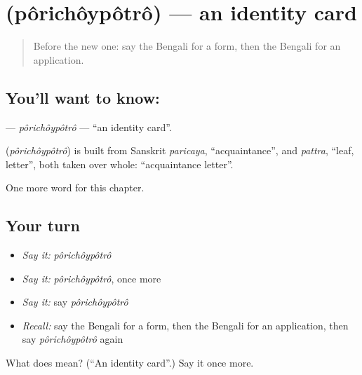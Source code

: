 \section[\texorpdfstring{\bn{পরিচয়পত্র} (pôrichôypôtrô)}{পরিচয়পত্র (pôrichôypôtrô)}]{ (pôrichôypôtrô) — an identity card}

\label{lesson:BN-C259-porichoypotro}



\begin{quote}
Before the new one: say the Bengali for a form, then the Bengali for an application.
\end{quote}

\subsection*{You'll want to know: }
\textbf{} — \emph{pôrichôypôtrô} — \textquotedblleft{}an identity card\textquotedblright{}.

\begin{cousinweb}
\textbf{} (\emph{pôrichôypôtrô}) is built from Sanskrit \emph{paricaya}, \textquotedblleft{}acquaintance\textquotedblright{}, and \emph{pattra}, \textquotedblleft{}leaf, letter\textquotedblright{}, both taken over whole: \textquotedblleft{}acquaintance letter\textquotedblright{}.
\end{cousinweb}

\begin{grammarlens}[title={What you've built}]
One more word for this chapter.
\end{grammarlens}

\subsection*{Your turn}
\begin{itemize}
\raggedright
  \item \emph{Say it:} \emph{pôrichôypôtrô}
  \item \emph{Say it:} \emph{pôrichôypôtrô}, once more
  \item \emph{Say it:} say \emph{pôrichôypôtrô}
  \item \emph{Recall:} say the Bengali for a form, then the Bengali for an application, then say \emph{pôrichôypôtrô} again
\end{itemize}

\begin{tcolorbox}[breakable,colback=teal!4,colframe=teal!35!black,title={Before you move on}]
What does  mean? (\textquotedblleft{}An identity card\textquotedblright{}.) Say it once more.
\end{tcolorbox}
